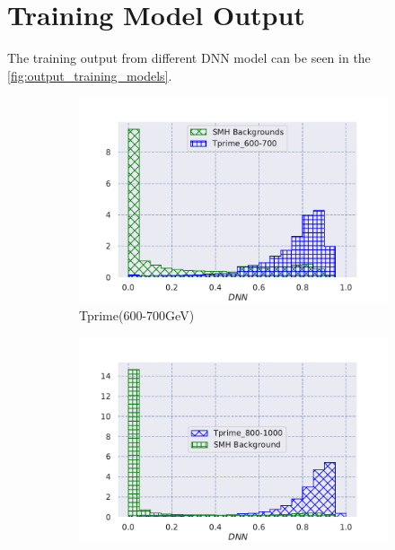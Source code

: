 \section{Training Model Output}
The training output from different DNN model can be seen in the \autoref{fig:output_training_models}.


\begin{figure}[H]
     \centering
     \begin{subfigure}[b]{0.47\textwidth}
         \centering
         \includegraphics[width=\textwidth]{figure_4/output_TPrime600-700_on_testing_all_background.pdf}
         \caption{Tprime(600-700GeV)}
         \label{fig:y equals x}
     \end{subfigure}
     \hfill
     \begin{subfigure}[b]{0.47\textwidth}
         \centering
         \includegraphics[width=\textwidth]{figure_4/output_TPrime800-1000_on_testing_all_background.pdf}

\end{subfigure}
\end{figure}
